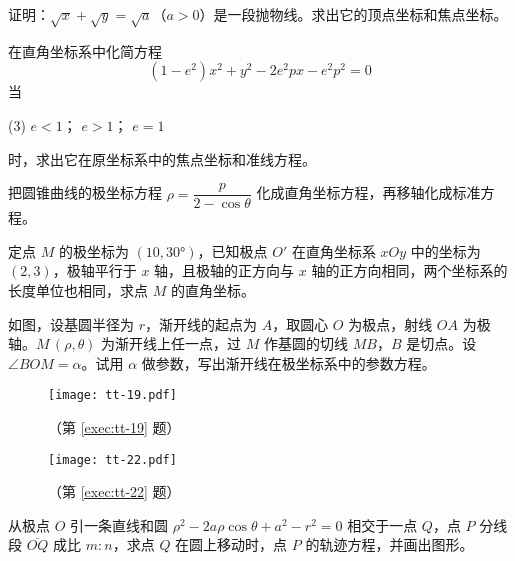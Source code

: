 \begin{question}
  \item 证明：$\sqrt{x}+\sqrt{y}=\sqrt{a}$（$a>0$）是一段抛物线。求出它的顶点坐标和焦点坐标。
  \item 在直角坐标系中化简方程
  \[(1-e^2)x^2+y^2-2e^2px-e^2p^2=0\]
  当
  \begin{tasks}(3)
    \task $e<1$；
    \task $e>1$；
    \task $e=1$
  \end{tasks}
  时，求出它在原坐标系中的焦点坐标和准线方程。
  \item 把圆锥曲线的极坐标方程 $\rho=\dfrac{p}{2-\cos\theta}$ 化成直角坐标方程，再移轴化成标准方程。
  \item 定点 $M$ 的极坐标为 $(10,\ang{30})$，已知极点 $O'$ 在直角坐标系 $xOy$ 中的坐标为 $(2,3)$，极轴平行于 $x$ 轴，且极轴的正方向与 $x$ 轴的正方向相同，两个坐标系的长度单位也相同，求点 $M$ 的直角坐标。
  \item\label{exec:tt-19} 如图，设基圆半径为 $r$，渐开线的起点为 $A$，取圆心 $O$ 为极点，射线 $OA$ 为极轴。$M\,(\rho,\theta)$ 为渐开线上任一点，过 $M$ 作基圆的切线 $MB$，$B$ 是切点。设 $\angle BOM=\alpha$。试用 $\alpha$ 做参数，写出渐开线在极坐标系中的参数方程。
  \begin{figure}
    \begin{minipage}[b]{0.3\linewidth}\centering
      \texttt{[image: tt-19.pdf]}
      \caption*{（第 \ref{exec:tt-19} 题）}
    \end{minipage}%
    \begin{minipage}[b]{0.65\linewidth}\centering
      \texttt{[image: tt-22.pdf]}
      \caption*{（第 \ref{exec:tt-22} 题）}
    \end{minipage}
  \end{figure}
  \item 从极点 $O$ 引一条直线和圆 $\rho^2-2a\rho\cos\theta+ a^2-r^2=0$ 相交于一点 $Q$，点 $P$ 分线段 $\overline{OQ}$ 成比 $m:n$，求点 $Q$ 在圆上移动时，点 $P$ 的轨迹方程，并画出图形。
\end{question}
